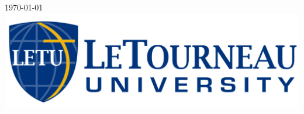 \begin{titlepage}

{\large \datef\today}\\[2cm] %


\includegraphics[scale=0.20]{gfx/logoHoriz.jpg}\\[1cm] %
 

\vfill %
\end{titlepage}